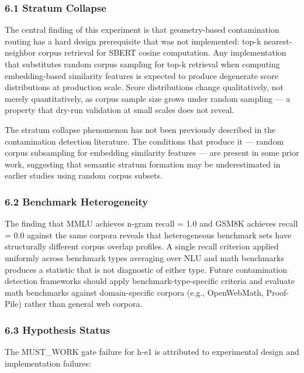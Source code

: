 
\subsubsection{6.1 Stratum Collapse}

The central finding of this experiment is that geometry-based contamination routing has a hard design prerequisite that was not implemented: top-k nearest-neighbor corpus retrieval for SBERT cosine computation. Any implementation that substitutes random corpus sampling for top-k retrieval when computing embedding-based similarity features is expected to produce degenerate score distributions at production scale. Score distributions change qualitatively, not merely quantitatively, as corpus sample size grows under random sampling — a property that dry-run validation at small scales does not reveal.

The stratum collapse phenomenon has not been previously described in the contamination detection literature. The conditions that produce it — random corpus subsampling for embedding similarity features — are present in some prior work, suggesting that semantic stratum formation may be underestimated in earlier studies using random corpus subsets.

\subsubsection{6.2 Benchmark Heterogeneity}

The finding that MMLU achieves n-gram recall = 1.0 and GSM8K achieves recall = 0.0 against the same corpora reveals that heterogeneous benchmark sets have structurally different corpus overlap profiles. A single recall criterion applied uniformly across benchmark types averaging over NLU and math benchmarks produces a statistic that is not diagnostic of either type. Future contamination detection frameworks should apply benchmark-type-specific criteria and evaluate math benchmarks against domain-specific corpora (e.g., OpenWebMath, Proof-Pile) rather than general web corpora.

\subsubsection{6.3 Hypothesis Status}

The MUST_WORK gate failure for h-e1 is attributed to experimental design and implementation failures:

